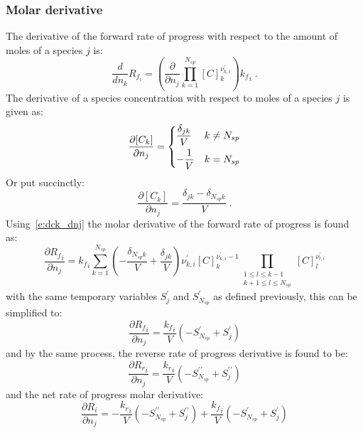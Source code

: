 \documentclass[12pt]{article}
\newcommand{\ns}{N_{sp}}
\begin{document}
\subsubsection{Molar derivative}
\label{s:rop_molar}
The derivative of the forward rate of progress with respect to the amount of moles of a species $j$ is:
\begin{equation}
 \frac{d}{d n_{k}} {R_{f_i}} = \left(\frac{\partial}{\partial n_{j}} \prod_{k=1}^{\ns} [C]_{k}^{\nu^{\prime}_{k,i}}\right) {k_f}_{i} \;.
\end{equation}
The derivative of a species concentration with respect to moles of a species $j$ is given as:
\begin{equation}
 \frac{\partial [C_k]}{\partial n_j} =
 \begin{dcases}
 \frac{\delta_{j k}}{V} & k \ne \ns \\
 -\frac{1}{V} & k = \ns
 \end{dcases}
\end{equation}
Or put succinctly:
\begin{equation}
\label{e:dck_dnj}
\frac{\partial [C_k]}{\partial n_j} = \frac{\delta_{j k} - \delta_{\ns k}}{V} \;.
\end{equation}
Using~\cref{e:dck_dnj} the molar derivative of the forward rate of progress is found as:
\begin{equation}
 \frac{\partial {R_f}_{i} }{\partial {n_j} } = {k_f}_{i} \sum_{k=1}^{\ns} \left(- \frac{\delta_{\ns k}}{V} + \frac{\delta_{j k}}{V}\right) \nu^{\prime}_{k,i} [C]_{k}^{\nu^{\prime}_{k,i} - 1} \prod_{\substack{1 \leq l \leq k - 1\\k + 1 \leq l \leq \ns}} [C]_{l}^{\nu^{\prime}_{l,i}}
\end{equation}
with the same temporary variables $S^{\prime}_{j}$ and $S^{\prime}_{\ns}$ as defined previously, this can be simplified to:
\begin{equation}
 \label{e:dropf_dnj}
 \frac{\partial {R_f}_{i} }{\partial {n_j} } = \frac{{k_f}_{i}}{V} \left(- S^{\prime}_{\ns} + S^{\prime}_{j}\right)
\end{equation}
and by the same process, the reverse rate of progress derivative is found to be:
\begin{equation}
 \label{e:dropr_dnj}
 \frac{\partial {R_r}_{i} }{\partial {n_j} } = \frac{{k_r}_{i}}{V} \left(- S^{\prime\prime}_{\ns} + S^{\prime\prime}_{j}\right)
\end{equation}
and the net rate of progress molar derivative:
\begin{equation}
 \frac{\partial R_{i} }{\partial {n_j} } = - \frac{{k_r}_{i}}{V} \left(- S^{\prime\prime}_{\ns} + S^{\prime\prime}_{j}\right) + \frac{{k_f}_{i}}{V} \left(- S^{\prime}_{\ns} + S^{\prime}_{j}\right)
\end{equation}
\end{document}
